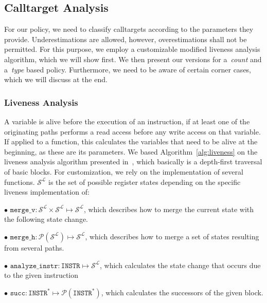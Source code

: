    
\subsection{Calltarget Analysis}
\label{section:calltargetanalysis}
For our policy, we need to classify calltargets according to the parameters they provide. Underestimations are allowed, however, overestimations 
shall not be permitted. For this purpose, we employ a customizable modified liveness analysis algorithm, which we will show first. 
We then present our versions for a~\emph{count} and a~\emph{type} based policy. Furthermore, we need to be aware of certain corner cases,
which we will discuss at the end.

\subsubsection{Liveness Analysis}
A variable is alive before the execution of an instruction, if at least one of the originating paths performs a read access before any write access on that variable. 
If applied to a function, this calculates the variables that need to be alive at the beginning, as these are its parameters. We based Algorithm~\ref{alg:liveness} 
on the liveness analysis algorithm presented in~\cite{khedker2009data}, which basically is a depth-first traversal of basic blocks. 
For customization, we rely on the implementation of several functions. $\mathcal{S}^\mathcal{L}$ is the set of possible register states depending on the specific liveness implementation of:

$\bullet$ $\texttt{merge\_v} : \mathcal{S}^\mathcal{L} \times \mathcal{S}^\mathcal{L} \mapsto \mathcal{S}^\mathcal{L}$, which describes how to merge the current state with the following state change.

$\bullet$ $\texttt{merge\_h} : \mathcal{P}(\mathcal{S}^\mathcal{L}) \mapsto \mathcal{S}^\mathcal{L}$, which describes how to merge a set of states resulting from several paths.

$\bullet$ $\texttt{analyze\_instr} : \texttt{INSTR} \mapsto \mathcal{S}^\mathcal{L}$, which calculates the state change that occurs due to the given instruction 

$\bullet$ $\texttt{succ} : \texttt{INSTR}^* \mapsto \mathcal{P}(\texttt{INSTR}^*)$, which calculates the successors of the given block.

